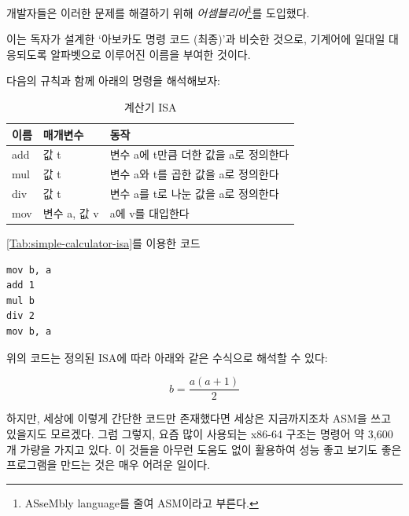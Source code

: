 \documentclass[a4paper,12pt]{book}
\begin{document}
개발자들은 이러한 문제를 해결하기 위해
\textit{어셈블리어}\footnote{ASseMbly language를 줄여 ASM이라고 부른다.}를 도입했다. 


이는 독자가 설계한 `아보카도 명령 코드 (최종)'과 비슷한 것으로,
기계어에 일대일 대응되도록 알파벳으로 이루어진 이름을 부여한 것이다.

다음의 규칙과 함께 아래의 명령을 해석해보자:

\begin{table}[!h]
    \centering

    \caption{계산기 ISA}
    \label{Tab:simple-calculator-isa}

    \begin{tabular}{ || m{2em} | m{5em} | m{22em} || }
        \hline
        이름 & 매개변수 & 동작 \\
        \hline\hline
        add  & 값 t & 변수 a에 t만큼 더한 값을 a로 정의한다 \\
        \hline
        mul  & 값 t & 변수 a와 t를 곱한 값을 a로 정의한다 \\
        \hline
        div  & 값 t & 변수 a를 t로 나눈 값을 a로 정의한다 \\
        \hline
        mov  & 변수 a, 값 v & a에 v를 대입한다 \\
        \hline
    \end{tabular}
\end{table}

\begin{center}

    \centering
    
    \autoref{Tab:simple-calculator-isa}를 이용한 코드

\begin{lstlisting}
mov b, a
add 1
mul b
div 2
mov b, a
\end{lstlisting}
\end{center}

위의 코드는 정의된 ISA에 따라 아래와 같은 수식으로 해석할 수 있다:

\begin{equation}
b = \frac{a(a + 1)}{2}
\end{equation}

하지만, 세상에 이렇게 간단한 코드만 존재했다면 세상은 지금까지조차 ASM을
쓰고 있을지도 모르겠다.
그럼 그렇지, 요즘 많이 사용되는 x86-64 구조는 명령어 약 3,600개 가량을
가지고 있다.
이 것들을 아무런 도움도 없이 활용하여 성능 좋고 보기도 좋은 프로그램을
만드는 것은 매우 어려운 일이다.

\end{document}
